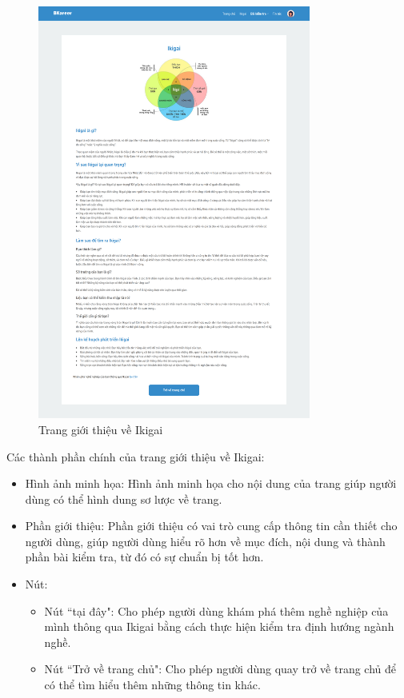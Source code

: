 \begin{figure}[H]
    \centering
    \includegraphics[width=0.8\textwidth]
    {images/chap5/ikigai.png}
    \vspace{0.5cm}
    \caption{Trang giới thiệu về Ikigai}
\end{figure}

Các thành phần chính của trang giới thiệu về Ikigai:
\begin{itemize}
    \item Hình ảnh minh họa: Hình ảnh minh họa cho nội dung của trang giúp người dùng có thể hình dung sơ lược về trang.
    \item Phần giới thiệu: Phần giới thiệu có vai trò cung cấp thông tin cần thiết cho người dùng, giúp người dùng hiểu rõ hơn về mục đích, nội dung và thành phần bài kiểm tra, từ đó có sự chuẩn bị tốt hơn.
    \item Nút:
        \begin{itemize}
            \item Nút ``tại đây": Cho phép người dùng khám phá thêm nghề nghiệp của mình thông qua Ikigai bằng cách thực hiện kiểm tra định hướng ngành nghề. 
            \item Nút ``Trở về trang chủ": Cho phép người dùng quay trở về trang chủ để có thể tìm hiểu thêm những thông tin khác.
        \end{itemize}
\end{itemize}


